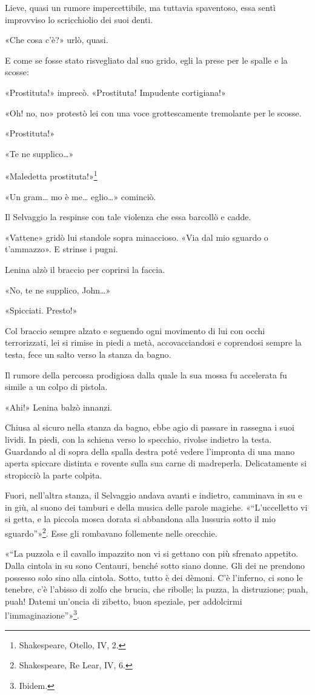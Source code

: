 \documentclass[
a5paper, %
10pt, %
twoside, 
onecolumn, %
openany, %
]{memoir}
\begin{document}
Lieve, quasi un rumore impercettibile, ma tuttavia spaventoso, essa sentì improvviso lo scricchiolio dei suoi denti.

«Che cosa c’è?» urlò, quasi.

E come se fosse stato risvegliato dal suo grido, egli la prese per le spalle e la scosse:

«Prostituta!» imprecò. «Prostituta! Impudente cortigiana!»

«Oh! no, no» protestò lei con una voce grottescamente tremolante per le scosse.

«Prostituta!»

«Te ne supplico…»

«Maledetta prostituta!»\footnote{Shakespeare, Otello, IV, 2.}

«Un gram… mo è me… eglio…» cominciò.

Il Selvaggio la respinse con tale violenza che essa barcollò e cadde.

«Vattene» gridò lui standole sopra minaccioso. «Via dal mio sguardo o t’ammazzo». E strinse i pugni.

Lenina alzò il braccio per coprirsi la faccia.

«No, te ne supplico, John…»

«Spicciati. Presto!»

Col braccio sempre alzato e seguendo ogni movimento di lui con occhi terrorizzati, lei si rimise in piedi a metà, accovacciandosi e coprendosi sempre la testa, fece un salto verso la stanza da bagno.

Il rumore della percossa prodigiosa dalla quale la sua mossa fu accelerata fu simile a un colpo di pistola.

«Ahi!» Lenina balzò innanzi.

Chiusa al sicuro nella stanza da bagno, ebbe agio di passare in rassegna i suoi lividi. In piedi, con la schiena verso lo specchio, rivolse indietro la testa. Guardando al di sopra della spalla destra poté vedere l’impronta di una mano aperta spiccare distinta e rovente sulla sua carne di madreperla. Delicatamente si stropicciò la parte colpita.

Fuori, nell’altra stanza, il Selvaggio andava avanti e indietro, camminava in su e in giù, al suono dei tamburi e della musica delle parole magiche. «“L’uccelletto vi si getta, e la piccola mosca dorata si abbandona alla lussuria sotto il mio sguardo”»\footnote{Shakespeare, Re Lear, IV, 6.}. Esse gli rombavano follemente nelle orecchie.

«“La puzzola e il cavallo impazzito non vi si gettano con più sfrenato appetito. Dalla cintola in su sono Centauri, benché sotto siano donne. Gli dei ne prendono possesso solo sino alla cintola. Sotto, tutto è dei dèmoni. C’è l’inferno, ci sono le tenebre, c’è l’abisso di zolfo che brucia, che ribolle; la puzza, la distruzione; puah, puah! Datemi un’oncia di zibetto, buon speziale, per addolcirmi l’immaginazione”»\footnote{Ibidem.}.
\end{document}
